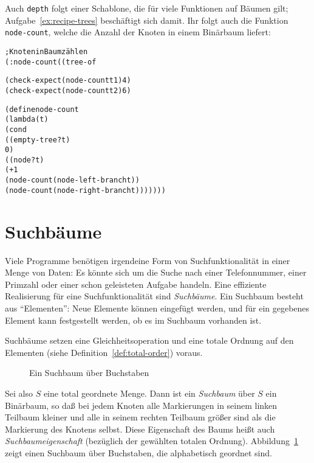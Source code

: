 Auch \texttt{depth} folgt einer 
Schablone, die für viele Funktionen auf Bäumen
gilt; Aufgabe~\ref{ex:recipe-trees} beschäftigt sich damit.
Ihr folgt auch die Funktion \texttt{node-count}, welche die Anzahl der
Knoten in einem Binärbaum liefert:
%
\begin{alltt}
; Knoten in Baum zählen
(: node-count ((tree-of %a) -> natural))

(check-expect (node-count t1) 4)
(check-expect (node-count t2) 6)

(define node-count
  (lambda (t)
    (cond
      ((empty-tree? t)
       0)
      ((node? t)
       (+ 1
          (node-count (node-left-branch t))
          (node-count (node-right-branch t)))))))
\end{alltt}
%

\section{Suchbäume}
\label{sec:search-trees}

Viele Programme benötigen irgendeine Form von Suchfunktionalität in
einer Menge von Daten: Es könnte sich um die Suche nach einer
Telefonnummer, einer Primzahl oder einer schon geleisteten Aufgabe
handeln.  Eine effiziente Realisierung für eine Suchfunktionalität
sind \textit{Suchbäume}.  Ein Suchbaum besteht aus
"`Elementen"': Neue Elemente können eingefügt werden, und für ein
gegebenes Element kann festgestellt werden, ob es im Suchbaum
vorhanden ist.

Suchbäume setzen eine Gleichheitsoperation und eine totale Ordnung auf
den Elementen (siehe Definition~\ref{def:total-order}) voraus.

\begin{figure}[tb]
\begin{pspdf}
\begin{center}
   {
     {  }
     {   } }
\end{center}
\end{pspdf}
  \caption{Ein Suchbaum über Buchstaben}
  \label{fig:searchtree}
\end{figure}

 Sei also $S$ eine total geordnete
Menge.  Dann ist ein \textit{Suchbaum} über $S$ ein Binärbaum, so daß bei
jedem Knoten alle Markierungen in seinem linken Teilbaum kleiner und
alle in seinem rechten Teilbaum größer sind als die Markierung des Knotens
selbst.  Diese Eigenschaft des Baums heißt auch
\textit{Suchbaumeigenschaft} (bezüglich der gewählten totalen
Ordnung).
Abbildung~\ref{fig:searchtree} zeigt einen Suchbaum über Buchstaben,
die alphabetisch geordnet sind.

